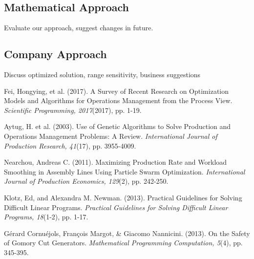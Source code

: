 \documentclass{article}
\begin{document}
\subsection{Mathematical Approach}
Evaluate our approach, suggest changes in future.
\subsection{Company Approach}
Discuss optimized solution, range sensitivity, business suggestions



	\newpage
	\begin{thebibliography}{5}
	
Fei, Hongying, et al. (2017). A Survey of Recent Research on Optimization Models and Algorithms for Operations Management from the Process View. 
\textit{Scientific Programming, 2017}(2017), pp. 1-19.
	
Aytug, H. et al. (2003). Use of Genetic Algorithms to Solve Production and Operations Management Problems: A Review. 
\textit{International Journal of Production Research, 41}(17), pp. 3955-4009.

Nearchou, Andreas C. (2011). Maximizing Production Rate and Workload Smoothing in Assembly Lines Using Particle Swarm Optimization. 
\textit{International Journal of Production Economics, 129}(2), pp. 242-250.

Klotz, Ed, and Alexandra M. Newman. (2013). Practical Guidelines for Solving Difficult Linear Programs. 
\textit{Practical Guidelines for Solving Difficult Linear Programs, 18}(1-2), pp. 1-17.

G\'{e}rard Cornu\'{e}jols, Fran\c{c}ois Margot, \& Giacomo Nannicini. (2013). On the Safety of Gomory Cut Generators. 
\textit{Mathematical Programming Computation, 5}(4), pp. 345-395.


\end{thebibliography}
\end{document}
